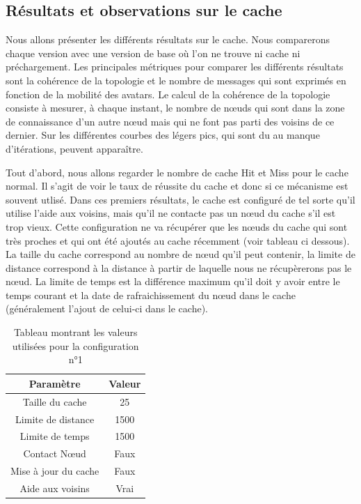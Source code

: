 \subsection{Résultats et observations sur le cache}
\label{resObsCache}

Nous allons présenter les différents résultats sur le cache. Nous comparerons chaque version avec une version de base où l'on ne trouve ni cache ni préchargement.
Les principales métriques pour comparer les différents résultats sont la cohérence de la topologie et le nombre de messages qui sont exprimés en fonction de la mobilité des avatars. Le calcul de la cohérence de la topologie consiste à mesurer, à chaque instant, le nombre de nœuds qui sont dans la zone de connaissance d'un autre nœud mais qui ne font pas parti des voisins de ce dernier. Sur les différentes courbes des légers pics, qui sont du au manque d'itérations, peuvent apparaître.

\par Tout d'abord, nous allons regarder le nombre de cache Hit et Miss pour le cache normal. Il s'agit de voir le taux de réussite du cache et donc si ce mécanisme est souvent utlisé. Dans ces premiers résultats, le cache est configuré de tel sorte qu'il utilise l'aide aux voisins, mais qu'il ne contacte pas un nœud du cache s'il est trop vieux. Cette configuration ne va récupérer que les nœuds du cache qui sont très proches et qui ont été ajoutés au cache récemment (voir tableau ci dessous). La taille du cache correspond au nombre de nœud qu'il peut contenir, la limite de distance correspond à la distance à partir de laquelle nous ne récupèrerons pas le nœud. La limite de temps est la différence maximum qu'il doit y avoir entre le temps courant et la date de rafraichissement du nœud dans le cache (généralement l'ajout de celui-ci dans le cache). 
\begin{table}[!h]
  \begin{center}
    \begin{tabular}{|c|c|}
      \hline
      Paramètre & Valeur\\
      \hline
      Taille du cache & 25\\
      Limite de distance &  1500\\
      Limite de temps & 1500\\
      Contact Nœud & Faux\\
      Mise à jour du cache & Faux\\
      Aide aux voisins & Vrai\\
      \hline
    \end{tabular}
  \end{center}
  \label{tab:config1}
  \caption{Tableau montrant les valeurs utilisées pour la configuration n°1}
\end{table}


